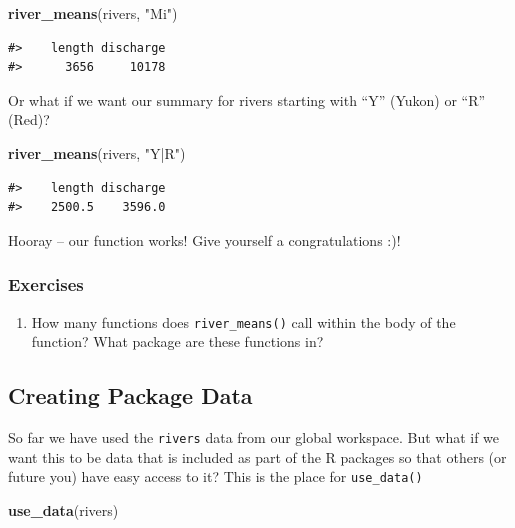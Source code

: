 \documentclass[
]{book}
\newenvironment{Shaded}{\begin{snugshade}}{\end{snugshade}}
\newcommand{\KeywordTok}[1]{\textcolor[rgb]{0.13,0.29,0.53}{\textbf{#1}}}
\newcommand{\NormalTok}[1]{#1}
\newcommand{\StringTok}[1]{\textcolor[rgb]{0.31,0.60,0.02}{#1}}
\providecommand{\tightlist}{%
  \setlength{\itemsep}{0pt}\setlength{\parskip}{0pt}}
\begin{document}
\begin{Shaded}
\begin{Highlighting}[]
\KeywordTok{river_means}\NormalTok{(rivers, }\StringTok{"Mi"}\NormalTok{)}
\end{Highlighting}
\end{Shaded}

\begin{verbatim}
#>    length discharge 
#>      3656     10178
\end{verbatim}

Or what if we want our summary for rivers starting with ``Y'' (Yukon) or ``R'' (Red)?

\begin{Shaded}
\begin{Highlighting}[]
\KeywordTok{river_means}\NormalTok{(rivers, }\StringTok{"Y|R"}\NormalTok{)}
\end{Highlighting}
\end{Shaded}

\begin{verbatim}
#>    length discharge 
#>    2500.5    3596.0
\end{verbatim}

Hooray -- our function works! Give yourself a congratulations :)!

\hypertarget{exercises-1}{%
\subsubsection{Exercises}\label{exercises-1}}

\begin{enumerate}
\def\labelenumi{\arabic{enumi}.}
\tightlist
\item
  How many functions does \texttt{river\_means()} call within the body of the function? What package are these functions in?
\end{enumerate}

\hypertarget{creating-package-data}{%
\subsection{Creating Package Data}\label{creating-package-data}}

So far we have used the \texttt{rivers} data from our global workspace. But what if we want this to be data that is included as part of the R packages so that others (or future you) have easy access to it? This is the place for \texttt{use\_data()}

\begin{Shaded}
\begin{Highlighting}[]
\KeywordTok{use_data}\NormalTok{(rivers)}
\end{Highlighting}
\end{Shaded}
\end{document}
